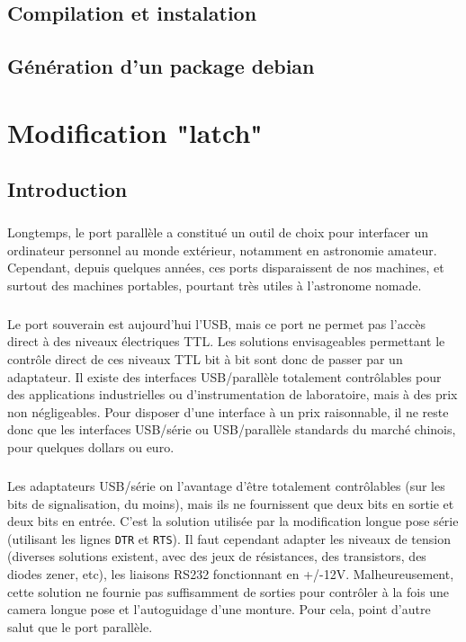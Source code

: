\documentclass[11pt,a4paper]{book}
\begin{document}
\section{Compilation et instalation}

\section{G\'en\'eration d'un package debian}

\chapter{Modification "latch"}

\section{Introduction}

\paragraph*{}
Longtemps, le port parall\`ele a constitu\'e un outil de choix pour
interfacer un ordinateur personnel au monde ext\'erieur, notamment en
astronomie amateur. Cependant, depuis quelques ann\'ees, ces ports
disparaissent de nos machines, et surtout des machines portables,
pourtant tr\`es utiles \`a l'astronome nomade.

\paragraph*{}
Le port souverain est aujourd'hui l'USB, mais ce port ne permet pas l'acc\`es
 direct \`a des niveaux \'electriques TTL. Les solutions envisageables
permettant le contr\^ole direct de ces niveaux TTL bit \`a bit sont donc de
passer par un adaptateur. Il existe des interfaces USB/parall\`ele totalement
contr\^olables pour des applications industrielles ou d'instrumentation de 
laboratoire, mais \`a des prix non n\'egligeables. Pour disposer d'une 
interface \`a un prix raisonnable, il ne reste donc que les interfaces USB/s\'erie 
ou USB/parall\`ele standards du march\'e chinois, pour quelques dollars ou euro.

\paragraph*{}
Les adaptateurs USB/s\'erie on l'avantage d'\^etre totalement contr\^olables (sur les bits
de signalisation, du moins), mais ils ne fournissent que deux bits en sortie et deux bits en
entr\'ee. C'est la solution utilis\'ee par la modification longue pose s\'erie (utilisant
les lignes {\tt DTR} et {\tt RTS}). Il faut cependant adapter les niveaux de tension 
(diverses solutions existent, avec des jeux de r\'esistances, des transistors, des diodes
 zener, etc), les liaisons RS232
 fonctionnant en +/-12V. Malheureusement, cette solution ne fournie pas suffisamment de 
 sorties pour contr\^oler \`a la fois une camera longue pose et l'autoguidage d'une
 monture. Pour cela, point d'autre salut que le port parall\`ele.
\end{document}
